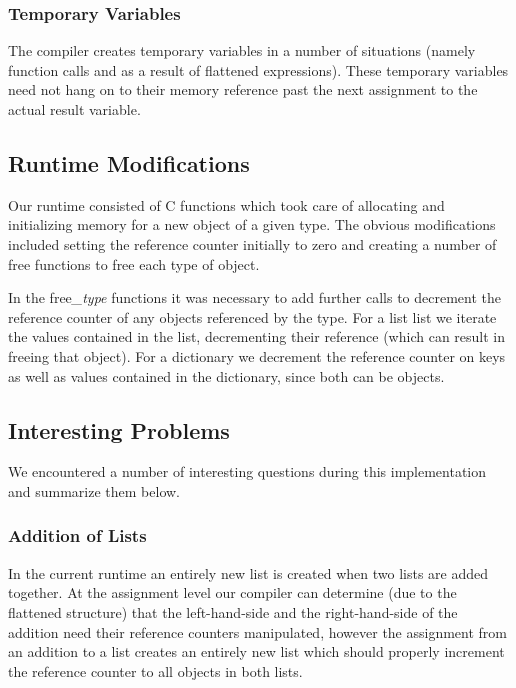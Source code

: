 \documentclass{sigplanconf}
\begin{document}
\subsubsection{Temporary Variables}
The compiler creates temporary variables in a number of situations (namely function calls and as a result of flattened expressions).  These temporary variables need not hang on to their memory reference past the next assignment to the actual result variable.
\subsection{Runtime Modifications}
Our runtime consisted of C functions which took care of allocating and initializing memory for a new object of a given type.  The obvious modifications included setting the reference counter initially to zero and creating a number of free functions to free each type of object.
\par
In the free\emph{\_type} functions it was necessary to add further calls to decrement the reference counter of any objects referenced by the type.  For a list list we iterate the values contained in the list, decrementing their reference (which can result in freeing that object).  For a dictionary we decrement the reference counter on keys as well as values contained in the dictionary, since both can be objects.
\subsection{Interesting Problems}
We encountered a number of interesting questions during this implementation and summarize them below.
\subsubsection{Addition of Lists}
In the current runtime an entirely new list is created when two lists are added together.  At the assignment level our compiler can determine (due to the flattened structure) that the left-hand-side and the right-hand-side of the addition need their reference counters manipulated, however the assignment from an addition to a list creates an entirely new list which should properly increment the reference counter to all objects in both lists.
\end{document}
